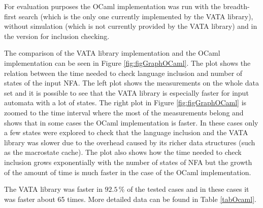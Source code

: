 For evaluation purposes the OCaml implementation was run with the breadth-first search (which is the only one currently implemented by the VATA library), without
simulation (which is not currently provided by the VATA library) and in the version for inclusion checking.

The comparison of the VATA library implementation and the OCaml implementation can be seen in Figure \ref{fig:figGraphOCaml}. 
The plot shows the relation between the time needed to check language inclusion and number of states of the input NFA.
The left plot shows the measurements on the whole data set and it is possible to see that the VATA library is especially faster for input automata with a lot
of states. The right plot in Figure \ref{fig:figGraphOCaml} is zoomed to the time interval where the most of the measurements belong and 
shows that in some cases the OCaml implementation is faster. In these cases only a few states were explored to 
check that the language inclusion and the VATA library was slower due to the overhead caused by its richer data structures 
(such as the macrostate cache). The plot also shows how the time needed to check inclusion grows exponentially with the number of states of NFA but 
the growth of the amount of time is much faster in the case of the OCaml implementation.

The VATA library was faster in $92.5\,\%$ of the tested cases and in these cases it was faster about 65 times. More detailed data can be found 
in Table \ref{tabOcaml}.

